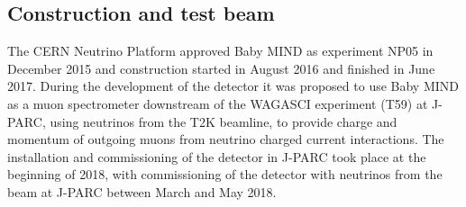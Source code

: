 

\subsection{Construction and test beam}

The CERN Neutrino Platform approved Baby MIND as experiment NP05 in December 2015 and construction started in August 2016 and finished in June 2017. During the development of the detector it was proposed to use Baby MIND as a muon spectrometer downstream of the WAGASCI experiment (T59) at J-PARC, using neutrinos from the T2K beamline, to provide charge and momentum of outgoing muons from neutrino charged current interactions. The installation and commissioning of the detector in J-PARC took place at the beginning of 2018, with commissioning of the detector with neutrinos from the beam at J-PARC between March and May 2018.


